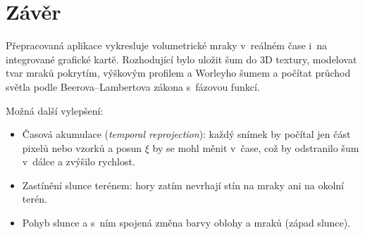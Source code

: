 \documentclass[a4paper, 12pt]{article}
\begin{document}

\section{Závěr}


Přepracovaná aplikace vykresluje volumetrické mraky v~reálném čase i~na
integrované grafické kartě. Rozhodující bylo uložit šum do 3D textury, modelovat
tvar mraků pokrytím, výškovým profilem a Worleyho šumem a počítat průchod světla
podle Beerova--Lambertova zákona s~fázovou funkcí.

Možná další vylepšení:

\begin{itemize}
  \item Časová akumulace (\textit{temporal reprojection}): každý snímek by
    počítal jen část pixelů nebo vzorků a posun $\xi$ by se mohl měnit v~čase,
    což by odstranilo šum v~dálce a zvýšilo rychlost.
  \item Zastínění slunce terénem: hory zatím nevrhají stín na mraky ani na
    okolní terén.
  \item Pohyb slunce a s~ním spojená změna barvy oblohy a mraků (západ slunce).
\end{itemize}

\nocite{url:clouds-wakapon}
\nocite{url:wiki-perlin-noise}


\begin{flushleft}
  
\end{flushleft}

\end{document}
